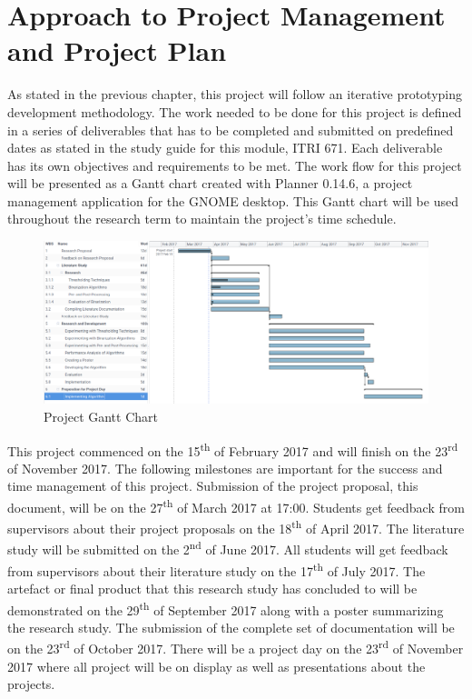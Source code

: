 \documentclass[11pt]{article}
\begin{document}
	\section{Approach to Project Management and Project Plan}
		As stated in the previous chapter, this project will follow an iterative prototyping development methodology. The work needed to be done for this project is defined in a series of deliverables that has to be completed and submitted on predefined dates as stated in the study guide for this module, ITRI 671. Each deliverable has its own objectives and requirements to be met. The work flow for this project will be presented as a Gantt chart created with Planner 0.14.6, a project management application for the \gls{GNOME} desktop. This Gantt chart will be used throughout the research term to maintain the project's time schedule.\\

		\begin{figure}[h]
			\centering
			\includegraphics[scale=0.29]{Gantt.png}
			\caption{Project Gantt Chart} %
			\label{gantt} %
		\end{figure}

		This project commenced on the 15\textsuperscript{th} of February 2017 and will finish on the 23\textsuperscript{rd} of November 2017. The following milestones are important for the success and time management of this project. Submission of the project proposal, this document, will be on the 27\textsuperscript{th} of March 2017 at 17:00. Students get feedback from supervisors about their project proposals on the 18\textsuperscript{th} of April 2017. The literature study will be submitted on the 2\textsuperscript{nd} of June 2017. All students will get feedback from supervisors about their literature study on the 17\textsuperscript{th} of July 2017. The artefact or final product that this research study has concluded to will be demonstrated on the 29\textsuperscript{th} of September 2017 along with a poster summarizing the research study. The submission of the complete set of documentation will be on the 23\textsuperscript{rd} of October 2017. There will be a project day on the 23\textsuperscript{rd} of November 2017 where all project will be on display as well as presentations about the projects.\\
\end{document}
